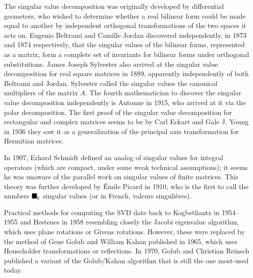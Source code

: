 \documentclass[aps,preprint]{revtex4}%
\providecommand{\U}[1]{\protect\rule{.1in}{.1in}}
\begin{document}
The singular value decomposition was originally developed by differential
geometers, who wished to determine whether a real bilinear form could be made
equal to another by independent orthogonal transformations of the two spaces
it acts on. Eugenio Beltrami and Camille Jordan discovered independently, in
1873 and 1874 respectively, that the singular values of the bilinear forms,
represented as a matrix, form a complete set of invariants for bilinear forms
under orthogonal substitutions. James Joseph Sylvester also arrived at the
singular value decomposition for real square matrices in 1889, apparently
independently of both Beltrami and Jordan. Sylvester called the singular
values the canonical multipliers of the matrix $A$. The fourth mathematician
to discover the singular value decomposition independently is Autonne in 1915,
who arrived at it via the polar decomposition. The first proof of the singular
value decomposition for rectangular and complex matrices seems to be by Carl
Eckart and Gale J. Young in 1936 they saw it as a generalization of the
principal axis transformation for Hermitian matrices.

In 1907, Erhard Schmidt defined an analog of singular values for integral
operators (which are compact, under some weak technical assumptions); it seems
he was unaware of the parallel work on singular values of finite matrices.
This theory was further developed by \'{E}mile Picard in 1910, who is the
first to call the numbers $\U{3c3} _{k}$ singular values (or in French,
valeurs singuli\`{e}res).

Practical methods for computing the SVD date back to Kogbetliantz in
1954--1955 and Hestenes in 1958 resembling closely the Jacobi eigenvalue
algorithm, which uses plane rotations or Givens rotations. However, these were
replaced by the method of Gene Golub and William Kahan published in 1965,
which uses Householder transformations or reflections. In 1970, Golub and
Christian Reinsch published a variant of the Golub/Kahan algorithm that is
still the one most-used today.
\end{document}
